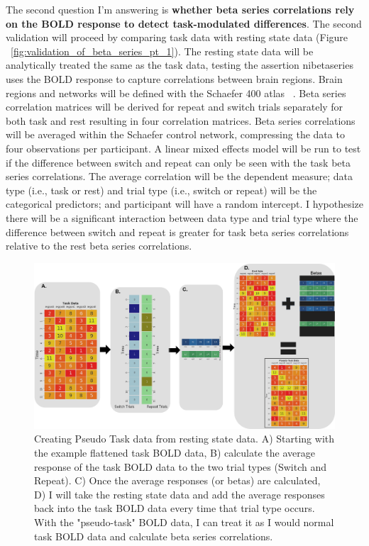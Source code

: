 \documentclass[phd,appendix,figures]{uithesis}
\begin{document}
\begin{itemize}
The second question I'm answering is \textbf{whether beta series correlations rely on the BOLD response to detect task-modulated differences}. 
The second validation will proceed by comparing task data with resting state data (Figure ~\ref{fig:validation_of_beta_series_pt_1}).
The resting state data will be analytically treated the same as the task data, testing the assertion nibetaseries uses the BOLD response to capture correlations between brain regions.
Brain regions and networks will be defined with the Schaefer 400 atlas ~\citep{schaefer2017}.
Beta series correlation matrices will be derived for repeat and switch trials separately for both task and rest resulting in four correlation matrices.
Beta series correlations will be averaged within the Schaefer control network, compressing the data to four observations per participant.
A linear mixed effects model will be run to test if the difference between switch and repeat can only be seen with the task beta series correlations.
The average correlation will be the dependent measure; data type (i.e., task or rest) and trial type (i.e., switch or repeat) will be the categorical predictors; and participant will have a random intercept.
I hypothesize there will be a significant interaction between data type and trial type where the difference between switch and repeat is greater for task beta series correlations relative to the rest beta series correlations.

\begin{figure}[H]%
	\centering
	\includegraphics[width=1\linewidth]{validation_of_beta_series_pt_2}
	\caption{Creating Pseudo Task data from resting state data.
	A) Starting with the example flattened task BOLD data, B) calculate the average response of the task BOLD data
	to the two trial types (Switch and Repeat).
	C) Once the average responses (or betas) are calculated,
	D) I will take the resting state data and add the average responses back into the task BOLD data
	every time that trial type occurs.
	With the "pseudo-task" BOLD data, I can treat it as I would normal task BOLD data and calculate beta series
	correlations.
	}
	\label{fig:validation_of_beta_series_pt_2}
\end{figure}


\end{itemize}
\end{document}
